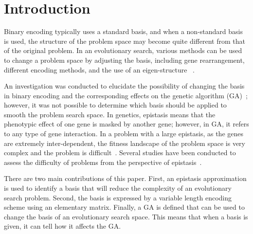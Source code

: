 \section{Introduction}
Binary encoding typically uses a standard basis, and when a non-standard basis is used, the structure of the problem space may become quite different from that of the original problem. In an evolutionary search, various methods can be used to change a problem space by adjusting the basis, including gene rearrangement, different encoding methods, and the use of an eigen-structure ~\cite{hwang2006multi, CHANG20091210, sankoff1998multiple, raidl2000weighted, falkenauer1994new, gen2006genetic, wang2009genetic, lotfi2013genetic, pernkopf2001feature, wang2006new, wu2012novel, wyatt2003finding}.

An investigation was conducted to elucidate the possibility of changing the basis in binary encoding and the corresponding effects on the genetic algorithm (GA)~\cite{kim2008effect}; however, it was not possible to determine which basis should be applied to smooth the problem search space. In genetics, epistasis means that the phenotypic effect of one gene is masked by another gene; however, in GA, it refers to any type of gene interaction. In a problem with a large epistasis, as the genes are extremely inter-dependent, the fitness landscape of the problem space is very complex and the problem is difficult~\cite{davidor1990epistasis}. Several studies have been conducted to assess the difficulty of problems from the perspective of epistasis~\cite{seo2003new, seo2004new, ventresca2007epistasis, seo2005computing, reeves1995epistasis, naudts2000comparison, beasley1993reducing}.

There are two main contributions of this paper. First, an epistasis approximation is used to identify a basis that will reduce the complexity of an evolutionary search problem. Second, the basis is expressed by a variable length encoding scheme using an elementary matrix. Finally, a GA is defined that can be used to change the basis of an evolutionary search space. {\color{red} This means that when a basis is given, it can tell how it affects the GA.}

